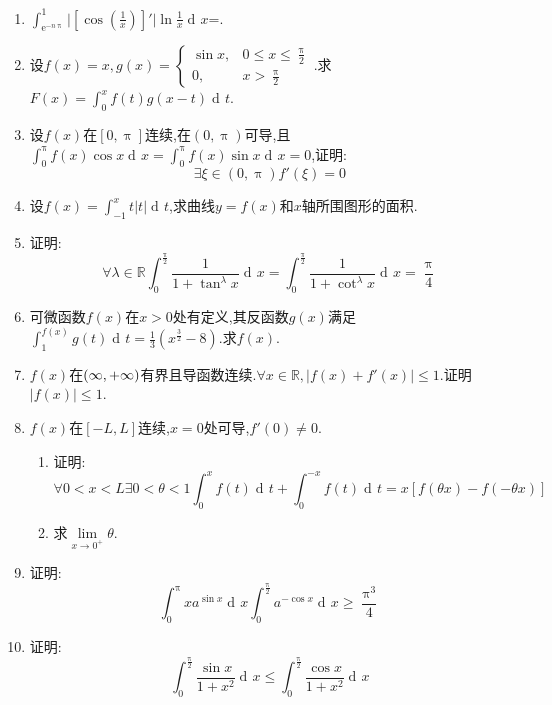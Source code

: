 \documentclass[utf8]{ctexart}
\newcommand{\tk}[1][1.5]{\underline{\mbox{\hspace{#1 cm}}}}
\newcommand{\abs}[1]{\lvert #1 \rvert}
\DeclareMathOperator\diff{d\!}
\newcommand{\e}{\mathrm{e}}
\begin{document}
\begin{enumerate}
   \item $\int^1_{\e^{-n\uppi}}\abs{[\cos(\frac{1}{x})]'}\ln\frac{1}{x}\diff x$=\tk.
   \item 设$f(x)=x,g(x)=\begin{cases}
	 \sin x,&0\leqslant x\leqslant\frac{\uppi}{2}\\
	 0,&x>\frac{\uppi}{2}
      \end{cases}$.求$F(x)=\int^x_0f(t)g(x-t)\diff t$.
   \item 设$f(x)$在$[0,\uppi]$连续,在$(0,\uppi)$可导,且$\int^\uppi_0f(x)\cos x\diff x=\int^\uppi_0f(x)\sin x\diff x=0$,证明:
      \[
	 \exists\xi\in(0,\uppi) f'(\xi)=0
      \]
   \item 设$f(x)=\int^x_{-1}t\abs{t}\diff t$,求曲线$y=f(x)$和$x$轴所围图形的面积.
   \item 证明:
      \[
	 \forall\lambda\in\mathbb{R} \int^\frac{\uppi}{2}_0\frac{1}{1+\tan^\lambda x}\diff x=\int^\frac{\uppi}{2}_0\frac{1}{1+\cot^\lambda x}\diff x=\frac{\uppi}{4}
      \]
   \item 可微函数$f(x)$在$x>0$处有定义,其反函数$g(x)$满足$\int^{f(x)}_1g(t)\diff t=\frac13(x^{\frac32}-8)$.求$f(x)$.
   \item $f(x)$在$(\-\infty,+\infty)$有界且导函数连续.$\forall x\in\mathbb{R},\abs{f(x)+f'(x)}\leqslant1$.证明$\abs{f(x)}\leqslant1$.
   \item $f(x)$在$[-L,L]$连续,$x=0$处可导,$f'(0)\neq0$.
      \begin{enumerate}
	 \item 证明:
	    \[
	       \forall 0<x<L\exists0<\theta<1 \int^x_0f(t)\diff t+\int^{-x}_0f(t)\diff t=x[f(\theta x)-f(-\theta x)]
	    \]
	 \item 求$\lim\limits_{x\rightarrow 0^+}\theta$.
      \end{enumerate}
   \item 证明:
      \[
	 \int^\uppi_0xa^{\sin x}\diff x\int^\frac{\uppi}{2}_0a^{-\cos x}\diff x\geqslant\frac{\uppi^3}{4}
      \]
   \item 证明:
      \[
	 \int^\frac{\uppi}{2}_0\frac{\sin x}{1+x^2}\diff x\leqslant\int^\frac{\uppi}{2}_0\frac{\cos x}{1+x^2}\diff x
      \]
\end{enumerate}
\end{document}
